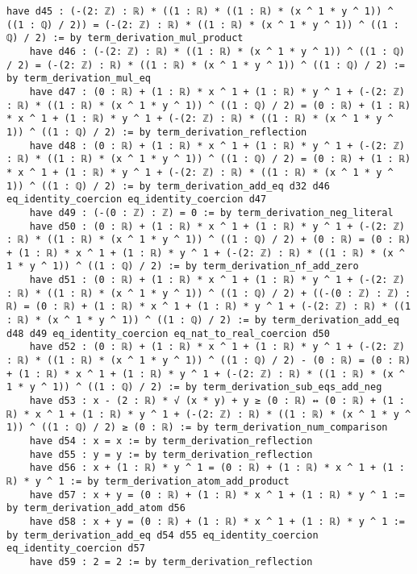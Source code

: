 \documentclass{article}
\begin{document}
\begin{tcolorbox}[colback=white!10, width=\linewidth]
\begin{lstlisting}[language=Lean4]
    have d45 : (-(2: ℤ) : ℝ) * ((1 : ℝ) * ((1 : ℝ) * (x ^ 1 * y ^ 1)) ^ ((1 : ℚ) / 2)) = (-(2: ℤ) : ℝ) * ((1 : ℝ) * (x ^ 1 * y ^ 1)) ^ ((1 : ℚ) / 2) := by term_derivation_mul_product
    have d46 : (-(2: ℤ) : ℝ) * ((1 : ℝ) * (x ^ 1 * y ^ 1)) ^ ((1 : ℚ) / 2) = (-(2: ℤ) : ℝ) * ((1 : ℝ) * (x ^ 1 * y ^ 1)) ^ ((1 : ℚ) / 2) := by term_derivation_mul_eq
    have d47 : (0 : ℝ) + (1 : ℝ) * x ^ 1 + (1 : ℝ) * y ^ 1 + (-(2: ℤ) : ℝ) * ((1 : ℝ) * (x ^ 1 * y ^ 1)) ^ ((1 : ℚ) / 2) = (0 : ℝ) + (1 : ℝ) * x ^ 1 + (1 : ℝ) * y ^ 1 + (-(2: ℤ) : ℝ) * ((1 : ℝ) * (x ^ 1 * y ^ 1)) ^ ((1 : ℚ) / 2) := by term_derivation_reflection
    have d48 : (0 : ℝ) + (1 : ℝ) * x ^ 1 + (1 : ℝ) * y ^ 1 + (-(2: ℤ) : ℝ) * ((1 : ℝ) * (x ^ 1 * y ^ 1)) ^ ((1 : ℚ) / 2) = (0 : ℝ) + (1 : ℝ) * x ^ 1 + (1 : ℝ) * y ^ 1 + (-(2: ℤ) : ℝ) * ((1 : ℝ) * (x ^ 1 * y ^ 1)) ^ ((1 : ℚ) / 2) := by term_derivation_add_eq d32 d46 eq_identity_coercion eq_identity_coercion d47
    have d49 : (-(0 : ℤ) : ℤ) = 0 := by term_derivation_neg_literal
    have d50 : (0 : ℝ) + (1 : ℝ) * x ^ 1 + (1 : ℝ) * y ^ 1 + (-(2: ℤ) : ℝ) * ((1 : ℝ) * (x ^ 1 * y ^ 1)) ^ ((1 : ℚ) / 2) + (0 : ℝ) = (0 : ℝ) + (1 : ℝ) * x ^ 1 + (1 : ℝ) * y ^ 1 + (-(2: ℤ) : ℝ) * ((1 : ℝ) * (x ^ 1 * y ^ 1)) ^ ((1 : ℚ) / 2) := by term_derivation_nf_add_zero
    have d51 : (0 : ℝ) + (1 : ℝ) * x ^ 1 + (1 : ℝ) * y ^ 1 + (-(2: ℤ) : ℝ) * ((1 : ℝ) * (x ^ 1 * y ^ 1)) ^ ((1 : ℚ) / 2) + ((-(0 : ℤ) : ℤ) : ℝ) = (0 : ℝ) + (1 : ℝ) * x ^ 1 + (1 : ℝ) * y ^ 1 + (-(2: ℤ) : ℝ) * ((1 : ℝ) * (x ^ 1 * y ^ 1)) ^ ((1 : ℚ) / 2) := by term_derivation_add_eq d48 d49 eq_identity_coercion eq_nat_to_real_coercion d50
    have d52 : (0 : ℝ) + (1 : ℝ) * x ^ 1 + (1 : ℝ) * y ^ 1 + (-(2: ℤ) : ℝ) * ((1 : ℝ) * (x ^ 1 * y ^ 1)) ^ ((1 : ℚ) / 2) - (0 : ℝ) = (0 : ℝ) + (1 : ℝ) * x ^ 1 + (1 : ℝ) * y ^ 1 + (-(2: ℤ) : ℝ) * ((1 : ℝ) * (x ^ 1 * y ^ 1)) ^ ((1 : ℚ) / 2) := by term_derivation_sub_eqs_add_neg
    have d53 : x - (2 : ℝ) * √ (x * y) + y ≥ (0 : ℝ) ↔ (0 : ℝ) + (1 : ℝ) * x ^ 1 + (1 : ℝ) * y ^ 1 + (-(2: ℤ) : ℝ) * ((1 : ℝ) * (x ^ 1 * y ^ 1)) ^ ((1 : ℚ) / 2) ≥ (0 : ℝ) := by term_derivation_num_comparison
    have d54 : x = x := by term_derivation_reflection
    have d55 : y = y := by term_derivation_reflection
    have d56 : x + (1 : ℝ) * y ^ 1 = (0 : ℝ) + (1 : ℝ) * x ^ 1 + (1 : ℝ) * y ^ 1 := by term_derivation_atom_add_product
    have d57 : x + y = (0 : ℝ) + (1 : ℝ) * x ^ 1 + (1 : ℝ) * y ^ 1 := by term_derivation_add_atom d56
    have d58 : x + y = (0 : ℝ) + (1 : ℝ) * x ^ 1 + (1 : ℝ) * y ^ 1 := by term_derivation_add_eq d54 d55 eq_identity_coercion eq_identity_coercion d57
    have d59 : 2 = 2 := by term_derivation_reflection

\end{lstlisting}
\end{tcolorbox}
\end{document}
